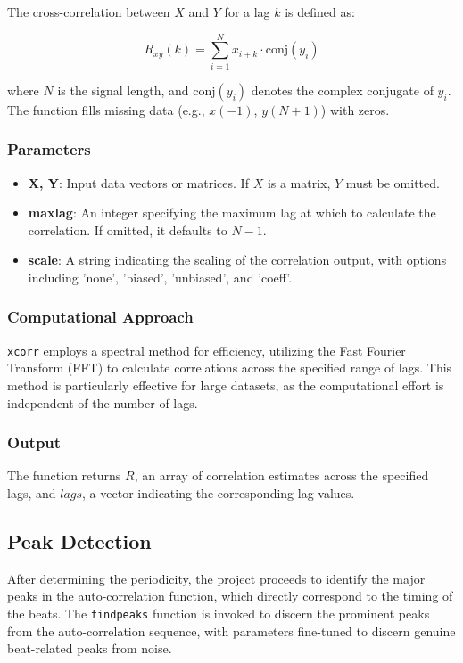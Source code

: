 The cross-correlation between \(X\) and \(Y\) for a lag \(k\) is defined as:

\[
R_{xy}(k) = \sum_{i=1}^{N} x_{i+k} \cdot \text{conj}(y_i)
\]

where \(N\) is the signal length, and \(\text{conj}(y_i)\) denotes the complex conjugate of \(y_i\). The function fills missing data (e.g., \(x(-1)\), \(y(N+1)\)) with zeros. 

\subsubsection{Parameters}

\begin{itemize}
    \item \textbf{X, Y}: Input data vectors or matrices. If \(X\) is a matrix, \(Y\) must be omitted.
    \item \textbf{maxlag}: An integer specifying the maximum lag at which to calculate the correlation. If omitted, it defaults to \(N-1\).
    \item \textbf{scale}: A string indicating the scaling of the correlation output, with options including 'none', 'biased', 'unbiased', and 'coeff'.
\end{itemize}

\subsubsection{Computational Approach}

\texttt{xcorr} employs a spectral method for efficiency, utilizing the Fast Fourier Transform (FFT) to calculate correlations across the specified range of lags. This method is particularly effective for large datasets, as the computational effort is independent of the number of lags.

\subsubsection{Output}

The function returns \(R\), an array of correlation estimates across the specified lags, and \(lags\), a vector indicating the corresponding lag values.

\subsection{Peak Detection}

After determining the periodicity, the project proceeds to identify the major peaks in the auto-correlation function, which directly correspond to the timing of the beats. The \texttt{findpeaks} function is invoked to discern the prominent peaks from the auto-correlation sequence, with parameters fine-tuned to discern genuine beat-related peaks from noise.

